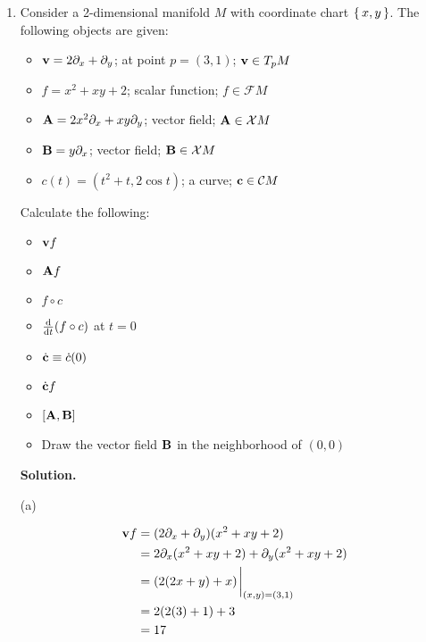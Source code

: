 \documentclass[10pt]{article}
\begin{document}

\begin{enumerate}[start=1,label={\bfseries Exercise \arabic*:},leftmargin=1in] %

    \item Consider a 2-dimensional manifold \(M\) with coordinate chart \(\set{x,y}\). The following objects are given:

        \begin{itemize}
            \item \(\vb{v} = 2\partial_x + \partial_y\); at point \(p = (3,1)\); \(\vb{v} \in T_p M\)
            \item \(f = x^2 + xy + 2\); scalar function; \(f \in \mathcal{F}M\)
            \item \(\vb{A} = 2x^2\partial_x + xy\partial_y\); vector field; \(\vb{A} \in \mathcal{X}M\)
            \item \(\vb{B} = y\partial_x\); vector field; \(\vb{B} \in \mathcal{X}M\)
            \item \(c(t) = (t^2 + t, 2\cos{t})\); a curve; \(\vb{c} \in \mathcal{C}M\)
        \end{itemize}

        \noindent Calculate the following:
        \begin{multicols}{2}
        \begin{itemize}
            \item \(\vb{v}f\)
            \item \(\vb{A}f\)
            \item \( f \circ c  \)
            \item \( \dv{t}(f \circ c) \) at \(t=0\)
            \item \( \dot{\vb{c}} \equiv \dot{c}(0) \)
            \item \( \dot{\vb{c}} f \)
            \item \( [\vb{A}, \vb{B}]  \)
            \item Draw the vector field \(\vb{B}\) in the neighborhood of \((0,0)\)
        \end{itemize}
        \end{multicols}
        \textbf{Solution.}

        \noindent (a)

        \begin{align*}
            \vb{v}f &= (2\partial_x + \partial_y)(x^2 + xy + 2) \\
                    &= 2 \partial_x(x^2 + xy + 2) + \partial_y(x^2 + xy + 2) \\
                    &= (2(2x + y) + x) \eval_{(x,y)=(3,1)} \\
                    &= 2(2(3)+1) + 3 \\
                    &= 17
        \end{align*}


\end{enumerate}
\end{document}
